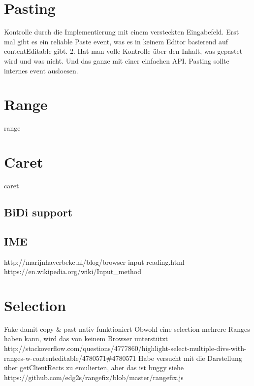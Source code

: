 \section{Pasting}


Kontrolle durch die Implementierung mit einem versteckten Eingabefeld. Erst mal gibt es ein reliable Paste event, was es in keinem Editor basierend auf contentEditable gibt. 2. Hat man volle Kontrolle über den Inhalt, was gepastet wird und was nicht. Und das ganze mit einer einfachen API. Pasting sollte internes event ausloesen.










\section{Range}
range





\section{Caret}
\label{subsec:caret}
caret
\subsection{BiDi support}
\subsection{IME} 
http://marijnhaverbeke.nl/blog/browser-input-reading.html 
https://en.wikipedia.org/wiki/Input\_method


\section{Selection}
Fake damit copy \& past nativ funktioniert
Obwohl eine selection mehrere Ranges haben kann, wird das von keinem Browser unterstützt http://stackoverflow.com/questions/4777860/highlight-select-multiple-divs-with-ranges-w-contenteditable/4780571\#4780571
Habe versucht mit die Darstellung über getClientRects zu emulierten, aber das ist buggy siehe https://github.com/edg2s/rangefix/blob/master/rangefix.js


